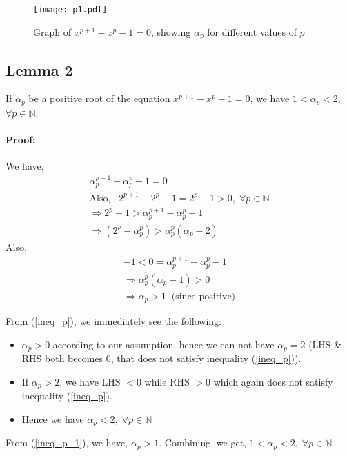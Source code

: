 \documentclass{ijcsa}
\begin{document}
\begin{figure}[htbp]
	\label{fig:f1}
	\centering
		\texttt{[image: p1.pdf]}
	\caption{Graph of $x^{p+1}-x^{p}-1=0$, showing $\alpha_p$ for different values of $p$}
\end{figure}

\subsection{Lemma 2}
\label{sec:Lemma2}
\par If $\alpha_{p}$ be a positive root of the equation $x^{p+1}-x^{p}-1=0$, we have $1<\alpha_{p}<2$,
$\forall{p} \in \mathbb{N}$.
\paragraph{Proof:}
\label{sec:Proof_2}
We have,
\begin{eqnarray}
\label{ineq_p}
\alpha_{p}^{p+1}-\alpha_{p}^{p}-1=0	\nonumber \\
\mbox{Also,} \;\;\; 2^{p+1}-2^{p}-1=2^{p}-1>0, \;\forall{p} \in \mathbb{N} \nonumber \\
\Rightarrow 2^{p}-1>\alpha_{p}^{p+1}-\alpha_{p}^{p}-1 \nonumber \\	
\Rightarrow (2^{p}-\alpha_{p}^{p})>\alpha_{p}^{p}(\alpha_{p}-2)
\end{eqnarray}
Also,
\begin{eqnarray}
\label{ineq_p_1}
-1<0=\alpha_{p}^{p+1}-\alpha_{p}^{p}-1 \nonumber \\	
\Rightarrow \alpha_{p}^{p}(\alpha_{p}-1)>0 \nonumber \\	
\Rightarrow \alpha_{p}>1 \;\;\mbox{(since positive)}
\end{eqnarray}

\par From (\ref{ineq_p}), we immediately see the following:
\begin{itemize}
	\item $\alpha_{p}>0$ according to our assumption, hence we can not have $\alpha_{p}=2$ 
				(LHS \& RHS both becomes 0, that does not satisfy inequality (\ref{ineq_p})).
	\item If $\alpha_{p}>2$, we have LHS $< 0$ while RHS $>0$ which again does not satisfy inequality (\ref{ineq_p}).
	\item Hence we have $\alpha_{p}<2,\;\forall{p}\in\mathbb{N}$
\end{itemize}
\par From (\ref{ineq_p_1}), we have, $\alpha_{p}>1$.
Combining, we get, $1<\alpha_{p}<2,\;\forall{p}\in\mathbb{N}$
\end{document}
